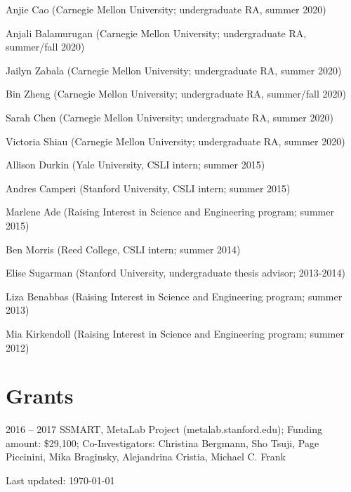 \documentclass[letterpaper]{article}
\def\footerlink{}
\renewenvironment{itemize}{
  \begin{list}{}{
    \setlength{\leftmargin}{1.5em}
  }
}{
  \end{list}
}
\begin{document}
\begin{itemize}

  \setlength\itemsep{.00001em}
  \setlength  \itemsep{-0.5em}
\item Anjie Cao (Carnegie Mellon University; undergraduate RA, summer 2020)
\item Anjali Balamurugan (Carnegie Mellon University;  undergraduate RA, summer/fall 2020)
\item Jailyn Zabala (Carnegie Mellon University;  undergraduate RA, summer 2020)
\item Bin  Zheng (Carnegie Mellon University;  undergraduate RA, summer/fall 2020)
\item Sarah Chen  (Carnegie Mellon University;  undergraduate RA, summer 2020)
\item Victoria Shiau (Carnegie Mellon University;  undergraduate RA, summer 2020)
\item Allison Durkin (Yale University, CSLI intern; summer 2015)
\item Andres Camperi (Stanford University, CSLI intern; summer 2015)
\item Marlene Ade (Raising Interest in Science and Engineering program; summer 2015)
\item Ben Morris (Reed College, CSLI intern; summer 2014)
\item Elise Sugarman (Stanford University, undergraduate thesis advisor; 2013-2014)
\item Liza Benabbas (Raising Interest in Science and Engineering program; summer 2013)
\item Mia Kirkendoll (Raising Interest in Science and Engineering program; summer 2012)

\end{itemize}

\section*{Grants}
\begin{itemize}
\item 2016 -- 2017 SSMART, MetaLab Project (metalab.stanford.edu); Funding amount: \$29,100; Co-Investigators: Christina Bergmann, Sho
Tsuji, Page Piccinini, Mika Braginsky, Alejandrina Cristia, Michael C. Frank
\end{itemize}



\bigskip

\begin{center}
  \begin{footnotesize}
    Last updated: \today \\
    \href{\footerlink}{\texttt{\footerlink}}
  \end{footnotesize}
\end{center}
\end{document}
